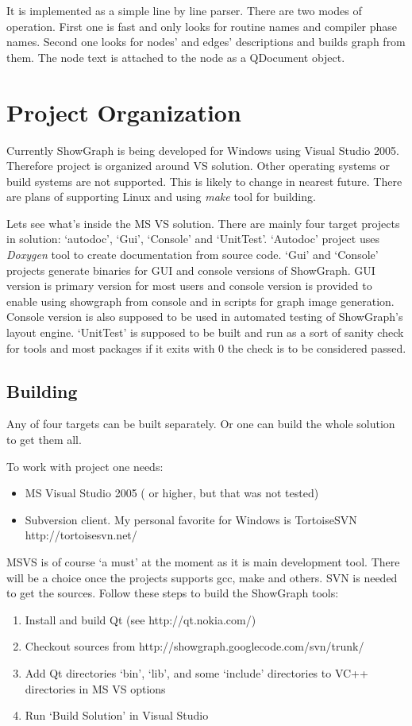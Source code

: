 \documentclass[11pt,a4paper]{article}
\begin{document}
It is implemented as a simple line by line parser. There are two modes of operation. First one is fast and only looks for routine names and compiler phase names. Second one looks for nodes' and edges' descriptions and builds graph from them. The node text is attached to the node as a QDocument object.

\section{Project Organization}
Currently ShowGraph is being developed for Windows using Visual Studio 2005. Therefore project is organized around VS solution. Other operating systems or build systems are not supported. This is likely to change in nearest future. There are plans of supporting Linux and using \emph{make} tool for building.

Lets see what's inside the MS VS solution. There are mainly four target projects in solution: `autodoc', `Gui', `Console' and `UnitTest'. `Autodoc' project uses \emph{Doxygen} tool to create documentation from source code. `Gui' and `Console' projects generate binaries for GUI and console versions of ShowGraph. GUI version is primary version for most users and console version is provided to enable using showgraph from console and in scripts for graph image generation. Console version is also supposed to be used in automated testing of ShowGraph's layout engine. `UnitTest' is supposed to be built and run as a sort of sanity check for tools and most packages if it exits with 0 the check is to be considered passed.


\subsection{Building}
Any of four targets can be built separately. Or one can build the whole solution to get them all.

To work with project one needs:
\begin{itemize}
\item MS Visual Studio 2005 ( or higher, but that was not tested)\
\item Subversion client. My personal favorite for Windows is TortoiseSVN http://tortoisesvn.net/
\end{itemize}

MSVS is of course `a must' at the moment as it is main development tool. There will be a choice once the projects supports gcc, make and others. SVN is needed to get the sources. Follow these steps to build the ShowGraph tools:
\begin{enumerate}
\item Install and build Qt (see http://qt.nokia.com/)
\item Checkout sources from http://showgraph.googlecode.com/svn/trunk/
\item Add Qt directories `bin', `lib', and some `include' directories to VC++ directories in MS VS options
\item Run `Build Solution' in Visual Studio
\end{enumerate}
\end{document}
